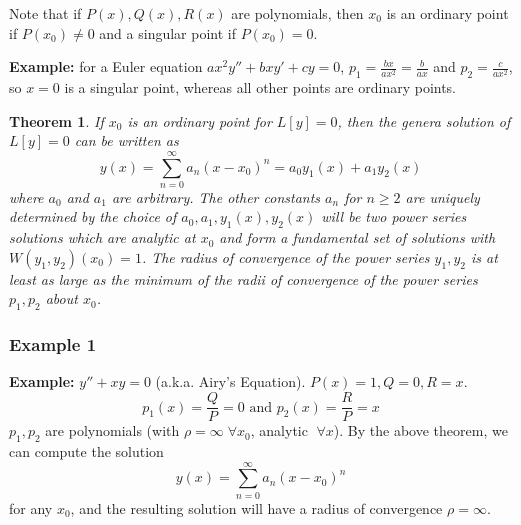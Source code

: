 \documentclass[11pt]{article}
\newtheorem{thm}{Theorem}[section]
\newcommand{\example}{\textbf{Example: }}
\newcommand{\sumseries}{\sum_{n=0}^{\infty}}
\newcommand{\powerser}{(x - x_0)^n}
\begin{document}
	Note that if $P(x), Q(x), R(x)$ are polynomials, then $x_0$ is an ordinary point if $P(x_0) \neq 0$ and a singular point if $P(x_0) = 0$.

	\example for a Euler equation $a x^2 y'' + b x y' + c y = 0$, $p_1 = \frac{bx}{ax^2} = \frac{b}{ax}$ and $p_2 = \frac{c}{ax^2}$, so $x=0$ is a singular point, whereas all other points are ordinary points.

	\begin{thm}
		If $x_0$ is an ordinary point for $L[y]=0$, then the genera solution of $L[y] = 0$ can be written as
			$$ y(x) = \sumseries a_n \powerser = a_0 y_1 (x) + a_1 y_2 (x) $$
		where $a_0$ and $a_1$ are arbitrary. The other constants $a_n$ for $n \geq 2$ are uniquely determined by the choice of $a_0, a_1, y_1(x), y_2(x)$ will be two power series solutions which are analytic at $x_0$ and form a fundamental set of solutions with $W(y_1, y_2)(x_0) = 1$. The radius of convergence of the power series $y_1, y_2$ is at least as large as the minimum of the radii of convergence of the power series $p_1, p_2$ about $x_0$.
	\end{thm}

\subsubsection{Example 1}
	\example $y'' + xy = 0$ (a.k.a. Airy's Equation). $P(x) = 1, Q = 0, R = x$.
		$$ p_1 (x) = \frac{Q}{P} = 0 \text{ and } p_2 (x) = \frac{R}{P} = x $$
	$p_1, p_2$ are polynomials (with $\rho = \infty \; \forall x_0$, analytic $\; \forall x$). By the above theorem, we can compute the solution
		$$ y(x) = \sumseries a_n \powerser $$
	for any $x_0$, and the resulting solution will have a radius of convergence $\rho = \infty$.
\end{document}
